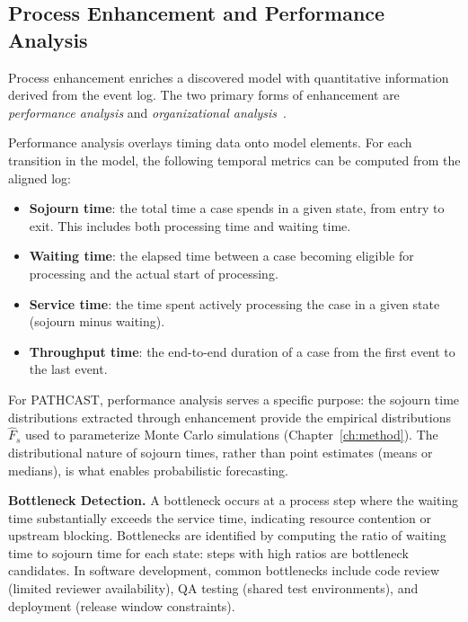 \subsection{Process Enhancement and Performance Analysis}
\label{sec:process-enhancement}

Process enhancement enriches a discovered model with quantitative
information derived from the event log. The two primary forms of
enhancement are \emph{performance analysis} and \emph{organizational
analysis}~\cite{aalst2016process}.

Performance analysis overlays timing data onto model elements. For each
transition in the model, the following temporal metrics can be computed
from the aligned log:

\begin{itemize}
    \item \textbf{Sojourn time}: the total time a case spends in a given
    state, from entry to exit. This includes both processing time and
    waiting time.
    \item \textbf{Waiting time}: the elapsed time between a case becoming
    eligible for processing and the actual start of processing.
    \item \textbf{Service time}: the time spent actively processing the
    case in a given state (sojourn minus waiting).
    \item \textbf{Throughput time}: the end-to-end duration of a case from
    the first event to the last event.
\end{itemize}

For PATHCAST, performance analysis serves a specific purpose: the
sojourn time distributions extracted through enhancement provide the
empirical distributions $\hat{F}_s$ used to parameterize Monte Carlo
simulations (Chapter~\ref{ch:method}). The distributional nature of sojourn
times, rather than point estimates (means or medians), is what enables
probabilistic forecasting.

\textbf{Bottleneck Detection.} A bottleneck occurs at a process step where
the waiting time substantially exceeds the service time, indicating
resource contention or upstream blocking. Bottlenecks are identified by
computing the ratio of waiting time to sojourn time for each state:
steps with high ratios are bottleneck candidates. In software development,
common bottlenecks include code review (limited reviewer availability),
QA testing (shared test environments), and deployment (release window
constraints).

